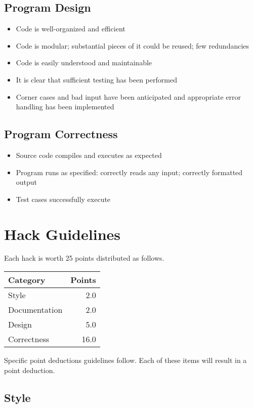 \documentclass[12pt]{scrartcl}
\begin{document}
\subsection*{Program Design}
\begin{itemize}
  \item Code is well-organized and efficient
  \item Code is modular; substantial pieces of it could be reused; few redundancies
  \item Code is easily understood and maintainable
  \item It is clear that sufficient testing has been performed
  \item Corner cases and bad input have been anticipated and appropriate error handling has been implemented  
\end{itemize}

\subsection*{Program Correctness}
\begin{itemize}
  \item Source code compiles and executes as expected
  \item Program runs as specified: correctly reads any input; correctly formatted output
  \item Test cases successfully execute
\end{itemize}

\section*{Hack Guidelines}

Each hack is worth 25 points distributed as follows.
\begin{table}[h]
\centering
\begin{tabular}{|l|r|}
\hline
Category & Points \\
\hline
Style & 2.0 \\
\hline
Documentation & 2.0 \\
\hline
Design & 5.0 \\
\hline
Correctness & 16.0 \\
\hline
\end{tabular}
\end{table}

Specific point deductions guidelines follow.  Each of these 
items will result in a point deduction.

\subsection*{Style}
\end{document}
